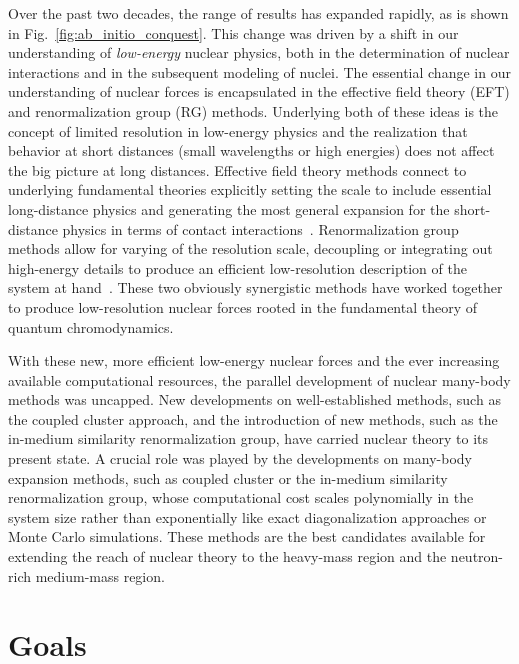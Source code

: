 Over the past two decades,
the range of \abinitio{} results has expanded rapidly,
as is shown in Fig.~\ref{fig:ab_initio_conquest}.
This change was driven by a shift in our understanding of \textit{low-energy}
nuclear physics,
both in the determination of nuclear interactions
and in the subsequent modeling of nuclei.
The essential change in our understanding of nuclear forces
is encapsulated in the effective field theory (EFT) and renormalization group (RG) methods.
Underlying both of these ideas is the concept of limited resolution in low-energy physics
and the realization that behavior at short distances (small wavelengths or high energies)
does not affect the big picture at long distances.
Effective field theory methods connect to underlying fundamental theories
explicitly setting the scale to include essential long-distance physics
and generating the most general expansion for the short-distance physics
in terms of contact interactions~\cite{Wein78eft,Hamm19nuceftreview,Epel08chiraleft,Mach11chiraleft}.
Renormalization group methods allow for varying of the resolution scale,
decoupling or integrating out high-energy details to produce an efficient low-resolution
description of the system at hand~\cite{Wils71rg,Bogn06srg,Bogn09vlowk}.
These two obviously synergistic methods have worked together to produce
low-resolution nuclear forces rooted in the fundamental theory of quantum chromodynamics.

With these new, more efficient low-energy nuclear forces
and the ever increasing available computational resources,
the parallel development of nuclear many-body methods was uncapped.
New developments on well-established methods,
such as the coupled cluster approach,
and the introduction of new methods,
such as the in-medium similarity renormalization group,
have carried \abinitio{} nuclear theory to its present state.
A crucial role was played by the developments on
many-body expansion methods, such as coupled cluster or
the in-medium similarity renormalization group,
whose computational cost scales polynomially
in the system size
rather than exponentially like
exact diagonalization approaches
or Monte Carlo simulations.
These methods are the best candidates available
for extending the reach of \abinitio{} nuclear theory
to the heavy-mass region
and the neutron-rich medium-mass region.

\section{Goals}

